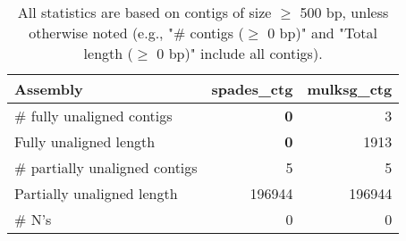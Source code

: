 \documentclass[12pt,a4paper]{article}
\begin{document}
\begin{table}[ht]
\begin{center}
\caption{All statistics are based on contigs of size $\geq$ 500 bp, unless otherwise noted (e.g., "\# contigs ($\geq$ 0 bp)" and "Total length ($\geq$ 0 bp)" include all contigs).}
\begin{tabular}{|l*{2}{|r}|}
\hline
Assembly & spades\_ctg & mulksg\_ctg \\ \hline
\# fully unaligned contigs & {\bf 0} & 3 \\ \hline
Fully unaligned length & {\bf 0} & 1913 \\ \hline
\# partially unaligned contigs & 5 & 5 \\ \hline
Partially unaligned length & 196944 & 196944 \\ \hline
\# N's & 0 & 0 \\ \hline
\end{tabular}
\end{center}
\end{table}
\end{document}
